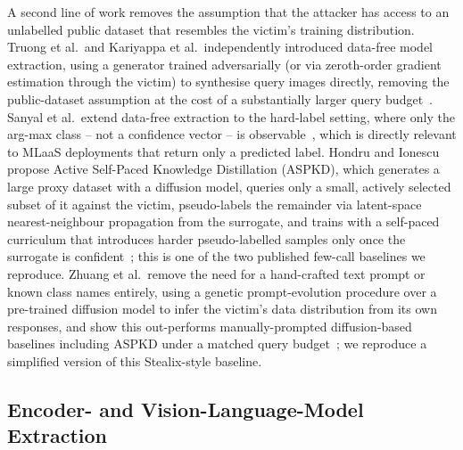 \documentclass[journal,10pt]{IEEEtran}
\begin{document}
A second line of work removes the assumption that the attacker has access to an unlabelled public
dataset that resembles the victim's training distribution. Truong et al.\ and Kariyappa et al.\
independently introduced data-free model extraction, using a generator trained adversarially (or
via zeroth-order gradient estimation through the victim) to synthesise query images directly,
removing the public-dataset assumption at the cost of a substantially larger query
budget~\cite{truong2021dfme,kariyappa2021maze}. Sanyal et al.\ extend data-free extraction to the
hard-label setting, where only the arg-max class -- not a confidence vector -- is
observable~\cite{sanyal2022hardlabel}, which is directly relevant to MLaaS deployments that
return only a predicted label. Hondru and Ionescu propose Active Self-Paced Knowledge
Distillation (ASPKD), which generates a large proxy dataset with a diffusion model, queries only a
small, actively selected subset of it against the victim, pseudo-labels the remainder via
latent-space nearest-neighbour propagation from the surrogate, and trains with a self-paced
curriculum that introduces harder pseudo-labelled samples only once the surrogate is
confident~\cite{hondru2025aspkd}; this is one of the two published few-call baselines we
reproduce. Zhuang et al.\ remove the need for a hand-crafted text prompt or known class names
entirely, using a genetic prompt-evolution procedure over a pre-trained diffusion model to infer
the victim's data distribution from its own responses, and show this out-performs
manually-prompted diffusion-based baselines including ASPKD under a matched query
budget~\cite{zhuang2025stealix}; we reproduce a simplified version of this Stealix-style baseline.

\subsection{Encoder- and Vision-Language-Model Extraction}
\end{document}
